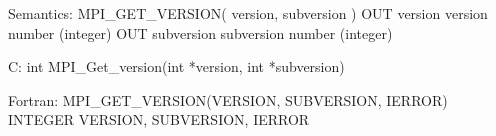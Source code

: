 Semantics:
  MPI_GET_VERSION( version, subversion )
  OUT version version number (integer)
  OUT subversion subversion number (integer)

C:
  int MPI_Get_version(int *version, int *subversion)

Fortran:
  MPI_GET_VERSION(VERSION, SUBVERSION, IERROR)
  INTEGER VERSION, SUBVERSION, IERROR

